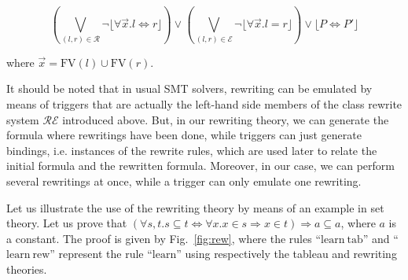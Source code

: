 $$(\bigvee_{(l,r)\in\mathcal{R}}
\neg\lfloor\forall{}\vec{x}.l\Leftrightarrow{}r\rfloor)\lor
(\bigvee_{(l,r)\in\mathcal{E}}\neg\lfloor\forall{}\vec{x}.l=r\rfloor)\lor
\lfloor{}P\Leftrightarrow{}P'\rfloor$$

where $\vec{x}=\mathrm{FV}(l)\cup\mathrm{FV}(r)$.

It should be noted that in usual SMT solvers, rewriting can be emulated by means
of triggers that are actually the left-hand side members of the class rewrite
system $\mathcal{RE}$ introduced above. But, in our rewriting theory, we can
generate the formula where rewritings have been done, while triggers can just
generate bindings, i.e. instances of the rewrite rules, which are used later to
relate the initial formula and the rewritten formula. Moreover, in our case, we
can perform several rewritings at once, while a trigger can only emulate one
rewriting.

Let us illustrate the use of the rewriting theory by means of an example in set
theory. Let us prove that
$(\forall{}s,t.s\subseteq{}t\Leftrightarrow{}\forall{}x.x\in{}s\Rightarrow{}
x\in{}t)\Rightarrow{}a\subseteq{}a$, where $a$ is a constant. The proof is given
by Fig.~\ref{fig:rew}, where the rules ``$\mathrm{learn~tab}$'' and
``$\mathrm{learn~rew}$'' represent the rule ``$\mathrm{learn}$'' using
respectively the tableau and rewriting theories.

